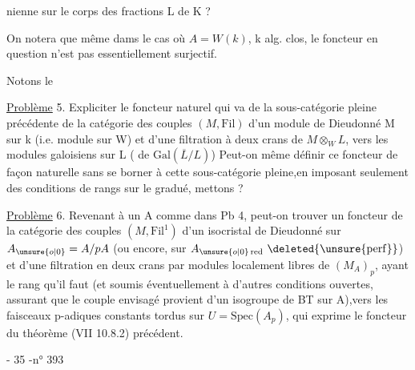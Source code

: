 nienne sur le corps des fractions  L de K ?

On notera que même dams le cas où $A=W(k)$, k alg. clos, le foncteur en question n'est pas  essentiellement surjectif.

Notons le

\uline{Problème} 5.  Expliciter le foncteur naturel qui va de la sous-catégorie pleine précédente de la catégorie des couples  $(M,\mathrm{Fil})$ d'un module de Dieudonné M sur  k (i.e.  module sur W) et d'une filtration à deux crans de $M\otimes_W L$, vers les modules galoisiens sur L (  de $\mathrm{Gal}(\overline{L}/L)$) Peut-on même définir ce foncteur  de façon naturelle sans se borner à cette sous-catégorie pleine,en imposant seulement des conditions de rangs sur le gradué, mettons ?

\uline{Problème} 6. Revenant à un A comme dans Pb 4, peut-on trouver un foncteur  de la catégorie des couples $(M,\mathrm{Fil}^{1})$ d'un isocristal de Dieudonné  sur $A_{\unsure{o|0}}=A/pA$ (ou encore, sur $A_{\unsure{o|0}\,\mathrm{red}}\ \deleted{\unsure{\mathrm{perf}}}$) et d'une filtration en deux crans par modules localement libres de $(M_A)_p$, ayant le rang qu'il faut\deleted{\unsure{,}} (et soumis éventuellement à d'autres conditions ouvertes, assurant que le couple envisagé provient d'un isogroupe de BT sur A),vers les faisceaux p-adiques constants tordus sur $U=\mathrm{Spec}(A_p)$, qui exprime le foncteur du théorème (VII 10.8.2) précédent.



\hfill - 35 -\hfill n° 393

